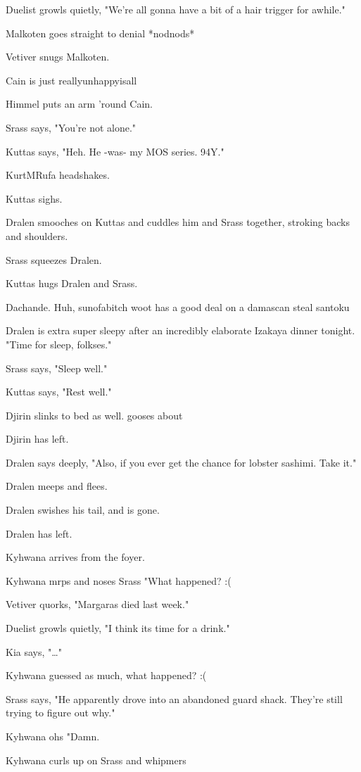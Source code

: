 Duelist growls quietly, "We're all gonna have a bit of a hair trigger for awhile."

Malkoten goes straight to denial *nodnods*

Vetiver snugs Malkoten.

Cain is just reallyunhappyisall

Himmel puts an arm 'round Cain.

Srass says, "You're not alone."

Kuttas says, "Heh. He -was- my MOS series. 94Y."

KurtMRufa headshakes.

Kuttas sighs.

Dralen smooches on Kuttas and cuddles him and Srass together, stroking backs and shoulders.

Srass squeezes Dralen.

Kuttas hugs Dralen and Srass.

Dachande. Huh, sunofabitch woot has a good deal on a damascan steal santoku

Dralen is extra super sleepy after an incredibly elaborate Izakaya dinner tonight. "Time for sleep, folkses."

Srass says, "Sleep well."

Kuttas says, "Rest well."

Djirin slinks to bed as well.  gooses about

Djirin has left.

Dralen says deeply, "Also, if you ever get the chance for lobster sashimi. Take it."

Dralen meeps and flees.

Dralen swishes his tail, and is gone.

Dralen has left.

Kyhwana arrives from the foyer.

Kyhwana mrps and noses Srass "What happened? :(

Vetiver quorks, "Margaras died last week."

Duelist growls quietly, "I think its time for a drink."

Kia says, "\ldots{}"

Kyhwana guessed as much, what happened? :(

Srass says, "He apparently drove into an abandoned guard shack.  They're still trying to figure out why."

Kyhwana ohs "Damn.

Kyhwana curls up on Srass and whipmers

